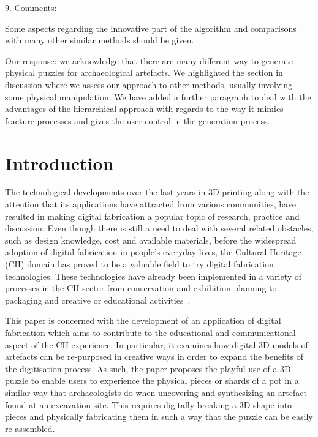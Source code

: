 \documentclass[acmlarge,screen,dvipsnames]{acmart}
\begin{document}
\greenEnd


9. Comments:

Some aspects regarding the innovative part of the algorithm and comparisons with many other similar methods should be given.

\greenBegin

Our response: we acknowledge that there are many different way to generate physical puzzles for archaeological artefacts. We highlighted the section in discussion where we assess our approach to other methods, usually involving some physical manipulation.  We have added a further paragraph to deal with the advantages of the hierarchical approach with regards to the way it mimics fracture processes and gives the user control in the generation process.

\greenEnd




\newpage
%
\maketitle




\section{Introduction}

The technological developments over the last years in 3D printing
along with the attention that its applications have attracted from
various communities, have resulted in making digital fabrication a
popular topic of research, practice and discussion. Even though there
is still a need to deal with several related obstacles, such as design
knowledge, cost and available materials, before the widespread
adoption of digital fabrication in people's everyday lives, the
Cultural Heritage (CH) domain has proved to be a valuable field to try
digital fabrication technologies. These technologies have already been
implemented in a variety of processes in the CH sector from
conservation and exhibition planning to packaging and creative or
educational
activities~\cite{Neely2013,Scopigno2014,Neumuller2014,Scopigno2015}.

This paper is concerned with the development of an application of
digital fabrication which aims to contribute to the educational and
communicational aspect of the CH experience. In particular, it
examines how digital 3D models of artefacts can be re-purposed in
creative ways in order to expand the benefits of the digitisation
process. As such, the paper proposes the playful use of a 3D puzzle to
enable users to experience the physical pieces or shards of a pot in a
similar way that archaeologists do when uncovering and synthesizing an
artefact found at an excavation site. This requires digitally breaking
a 3D shape into pieces and physically fabricating them in such a way
that the puzzle can be easily re-assembled.
\end{document}
